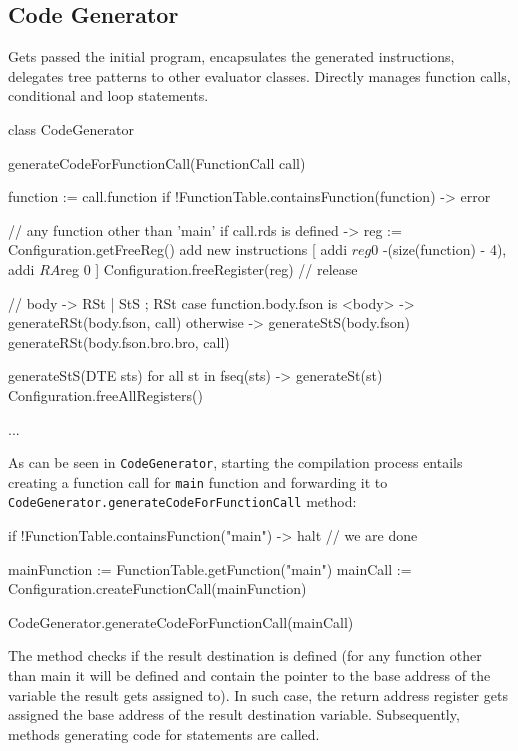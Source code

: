 \subsection{Code Generator}
Gets passed the initial program, encapsulates the generated instructions, delegates tree patterns to other
evaluator classes. Directly manages function calls, conditional and loop statements.

\begin{codeblock}
class CodeGenerator {
    generateCodeForFunctionCall(FunctionCall call) {
        function := call.function
        if !FunctionTable.containsFunction(function) -> { error }

        // any function other than 'main'
        if call.rds is defined -> {
            reg := Configuration.getFreeReg()
            add new instructions [
                addi $reg $0 -(size(function) - 4),
                addi $RA $reg 0
            ]
            Configuration.freeRegister(reg) // release
        }

        // body -> RSt | StS ; RSt
        case function.body.fson is <body> -> generateRSt(body.fson, call)
        otherwise -> {
            generateStS(body.fson)
            generateRSt(body.fson.bro.bro, call)
        }
    }

    generateStS(DTE sts) {
        for all st in fseq(sts) -> {
            generateSt(st)
            Configuration.freeAllRegisters()
        }
    }

    ...
}
\end{codeblock}
As can be seen in \verb+CodeGenerator+, starting the compilation process entails creating a function call for
\verb+main+ function and forwarding it to \verb+CodeGenerator.generateCodeForFunctionCall+ method:
\begin{codeblock}
if !FunctionTable.containsFunction("main") -> { halt } // we are done

mainFunction := FunctionTable.getFunction("main")
mainCall := Configuration.createFunctionCall(mainFunction)

CodeGenerator.generateCodeForFunctionCall(mainCall)
\end{codeblock}
The method checks if the result destination is defined (for any function other than main it will be defined
and contain the pointer to the base address of the variable the result gets assigned to). In such case, the return address
register gets assigned the base address of the result destination variable. Subsequently, methods generating code for
statements are called.

